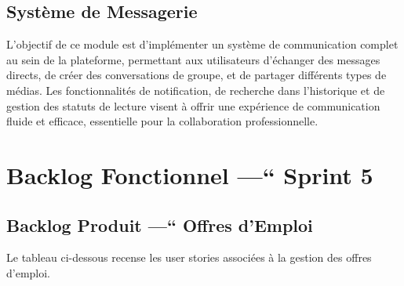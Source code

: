 \subsection{Système de Messagerie}
L'objectif de ce module est d'implémenter un système de communication complet au sein de la plateforme, permettant aux utilisateurs d'échanger des messages directs, de créer des conversations de groupe, et de partager différents types de médias. Les fonctionnalités de notification, de recherche dans l'historique et de gestion des statuts de lecture visent à offrir une expérience de communication fluide et efficace, essentielle pour la collaboration professionnelle.

\section{Backlog Fonctionnel —“ Sprint 5}

\subsection{Backlog Produit —“ Offres d'Emploi}
Le tableau ci-dessous recense les user stories associées à la gestion des offres d'emploi. 

\usepackage{tabularx}
\usepackage{float}
\usepackage{caption}

